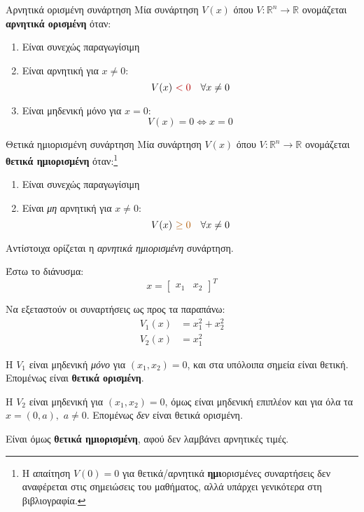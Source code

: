 \documentclass[11pt,a4paper,notitlepage,fleqn]{article}
\begin{document}
\begin{defn}{Αρνητικά ορισμένη συνάρτηση}{}
	Μία συνάρτηση \( V(x) \) όπου \( V: \mathbb R^n \to \mathbb R \) ονομάζεται \textbf{αρνητικά
		ορισμένη} όταν:
	\begin{enumerate}
		\item Είναι συνεχώς παραγωγίσιμη
		\item Είναι {\color{red!70!black}αρνητική} για \( x\neq 0 \):
		\[
		V(x) ~ {\color{red!70!black}< 0} \quad \forall x\neq 0
		\]
		\item Είναι μηδενική μόνο για \( x=0 \):
		\[
		V(x) = 0 \iff x=0
		\]
	\end{enumerate}
\end{defn}

\begin{defn}{Θετικά ημιορισμένη συνάρτηση}{}
	Μία συνάρτηση \( V(x) \) όπου \( V: \mathbb R^n \to \mathbb R \) ονομάζεται \textbf{θετικά
		ημιορισμένη} όταν:\footnote{Η απαίτηση \( V(0) = 0 \) για θετικά/αρνητικά \textbf{ημι}ορισμένες συναρτήσεις δεν αναφέρεται στις σημειώσεις του
		μαθήματος, αλλά υπάρχει γενικότερα στη βιβλιογραφία.}
	\begin{enumerate}
		\item Είναι συνεχώς παραγωγίσιμη
		\item Είναι {\color{orange!70!black}\textit{μη} αρνητική} για \( x\neq 0 \):
		\[
		V(x) ~ {\color{orange!70!black}\geq 0} \quad \forall x\neq 0
		\]
		
	\end{enumerate}
\end{defn}
Αντίστοιχα ορίζεται η \textit{αρνητικά ημιορισμένη} συνάρτηση.

\begin{exercise}[Παράδειγμα]
	Έστω το διάνυσμα:
	\[
	x = \left[\begin{matrix}
	x_1 & x_2
	\end{matrix}\right]^T
	\]
	
	Να εξεταστούν οι συναρτήσεις ως προς τα παραπάνω:
	\begin{align*}
		V_1(x) &= x_1^2 + x_2^2 \\
		V_2(x) &= x_1^2
	\end{align*}
	\tcblower
	\begin{enumparen}
		\item Η \( V_1 \) είναι μηδενική \textit{μόνο} για \( (x_1,x_2) = 0 \),
		και στα υπόλοιπα σημεία είναι θετική. Επομένως είναι \textbf{θετικά ορισμένη}.
		\item Η \( V_2 \) είναι μηδενική για \( (x_1,x_2) = 0\), όμως είναι μηδενική επιπλέον και για όλα
		τα \( x= (0,a), \) \quad \( a \neq 0 \). Επομένως \textit{δεν} είναι θετικά ορισμένη.
		
		Είναι όμως \textbf{θετικά ημιορισμένη}, αφού δεν λαμβάνει
		αρνητικές τιμές.
	\end{enumparen}
\end{exercise}
\end{document}

